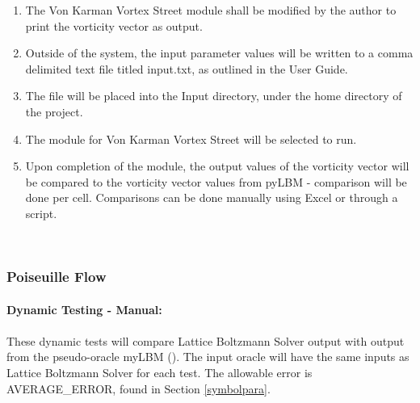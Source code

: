 \documentclass[12pt, titlepage]{article}
\newcommand{\famname}{Lattice Boltzmann Solver}
\begin{document}
\begin{enumerate}
\begin{enumerate}
\item The Von Karman Vortex Street module shall be modified by the author to print the vorticity vector as output.
\item Outside of the system, the input parameter values will be written to a comma delimited text file titled input.txt, as outlined in the User Guide.
\item The file will be placed into the Input directory, under the home directory of the project.
\item The module for Von Karman Vortex Street will be selected to run.
\item Upon completion of the module, the output values of the vorticity vector will be compared to the vorticity vector values from pyLBM - comparison will be done per cell. Comparisons can be done manually using Excel or through a script.\\
\end{enumerate}

\end{enumerate}
~\newpage

\subsubsection{Poiseuille Flow}
\label{frpf}

\paragraph{Dynamic Testing - Manual:}
\paragraph{} These dynamic tests will compare {\famname} output with output from the pseudo-oracle myLBM (\citet{pylbmcode}). The input oracle will have the same inputs as {\famname} for each test. The allowable error is AVERAGE\_ERROR, found in Section \ref{symbolpara}.
\end{document}
